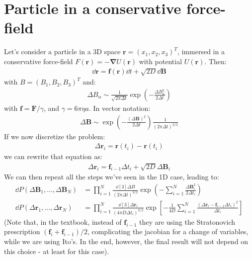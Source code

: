 \documentclass[../template.tex]{subfiles}
\begin{document}
\section{Particle in a conservative force-field}
Let's consider a particle in a 3D space $\bm{r} = (x_1, x_2, x_3)^T$, immersed in a conservative force-field $F(\bm{r}) = -\bm{\nabla} U(\bm{r})$ with potential $U(\bm{r})$. Then:
\begin{align*}
    \dd{\bm{r}} = \bm{f}(\bm{r})  \dd{t} + \sqrt{2D} \dd{\bm{B}}
\end{align*}     
with $B= (B_1, B_2 , B_3 )^T$ and:
\begin{align*}
    \Delta B_\alpha \sim \frac{1}{\sqrt{2 \pi \Delta t} } \exp\left(-\frac{\Delta B^2_\alpha}{2 \Delta t} \right)
\end{align*}
with $\bm{f} = \bm{F}/\gamma$, and $\gamma = 6 \pi \eta a$. In vector notation:
\begin{align*}
    \Delta \bm{B} \sim \exp\left(-\frac{(\Delta \bm{B})^2}{2 \Delta t} \right) \frac{1}{(2 \pi \Delta t)^{3/2}} 
\end{align*}  
If we now discretize the problem:
\begin{align*}
    \Delta \bm{r}_i = \bm{r} (t_i) - \bm{r}(t_i)
\end{align*}
we can rewrite that equation as:
\begin{align*}
    \Delta \bm{r}_i = \bm{f}_{i-1} \Delta t_i + \sqrt{2D} \Delta \bm{B}_i
\end{align*}
We can then repeat all the steps we've seen in the 1D case, leading to:
\begin{align*}
    \dd{P}(\Delta \bm{B}_1, \dots, \Delta \bm{B}_N) &= \prod_{i=1}^N \frac{\dd[3]{\Delta B}}{(2 \pi \Delta t)^{3/2}} \exp\left(-\sum_{i=1}^N \frac{\Delta \bm{B}_i^2}{2 \Delta t_i} \right)\\
    \dd{P}(\Delta \bm{r}_1, \dots, \Delta \bm{r}_N) &= \prod_{i=1}^N \frac{\dd[3]{\Delta \bm{r}_i}}{(4 \pi D \Delta t_i)^{3/2}} \exp\left[-\frac{1}{4D} \sum_{i=1}^N \frac{(\Delta \bm{r}_i - \bm{f}_{i-1} \Delta t_i)^2}{\Delta t_i}  \right] 
\end{align*}
(Note that, in the textbook, instead of $\bm{f}_{i-1}$ they are using the Stratonovich prescription $(\bm{f}_i + \bm{f}_{i-1})/2$, complicating the jacobian for a change of variables, while we are using Ito's. In the end, however, the final result will not depend on this choice - at least for this case).
\end{document}
